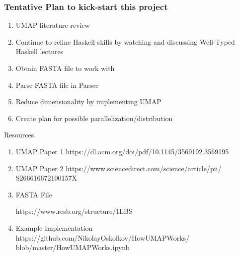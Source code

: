 \documentclass{beamer}
\begin{document}
\begin{frame}
  \frametitle{Tentative Plan to kick-start this project}
  \begin{enumerate}
  \item UMAP literature review
  \item Continue to refine Haskell skills by watching and discussing Well-Typed Haskell lectures
  \item Obtain FASTA file to work with
  \item Parse FASTA file in Parsec  
  \item Reduce dimensionality by implementing UMAP 
  \item Create plan for possible parallelization/distribution
  \end{enumerate}
\end{frame}

\begin{frame}{Resources}
    \begin{enumerate}
        \item UMAP Paper 1
        https://dl.acm.org/doi/pdf/10.1145/3569192.3569195
        \item UMAP Paper 2 https://www.sciencedirect.com/science/article/pii/
        S266616672100157X
        \item FASTA File
        
        https://www.rcsb.org/structure/1LBS
        \item Example Implementation
        https://github.com/NikolayOskolkov/HowUMAPWorks/
        blob/master/HowUMAPWorks.ipynb
    \end{enumerate}
\end{frame}
\end{document}
